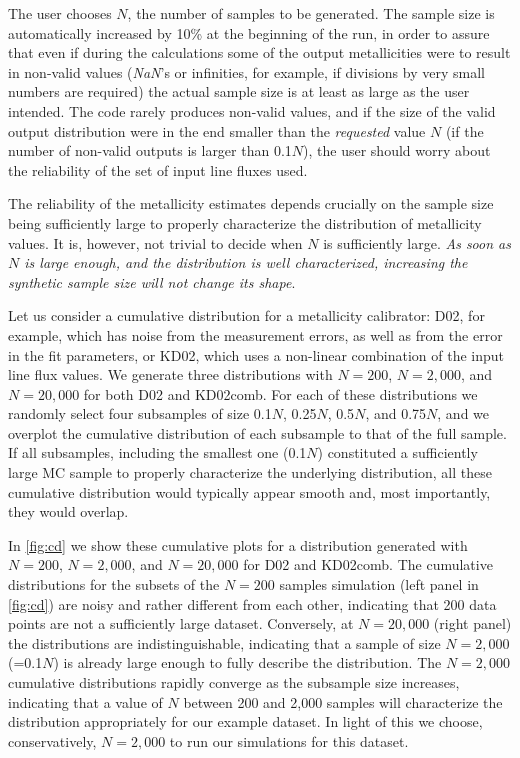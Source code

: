 \documentclass{emulateapj}
\begin{document}
The user chooses $N$, the number of samples to be generated. The
sample size is automatically increased by 10\% at the beginning of the
run, in order to assure that even if during the calculations some of
the output metallicities were to result in non-valid values
(\emph{NaN}'s or infinities, for example, if divisions by very small
numbers are required) the actual sample size is at least as large as
the user intended.  The code rarely produces non-valid values, and if
the size of the valid output distribution were in the end smaller than
the \emph{requested} value $N$ (if the number of non-valid outputs is
larger than 0.1$N$), the user should worry about the reliability of
the set of input line fluxes used.

The reliability of the metallicity estimates depends crucially on the
sample size being sufficiently large to properly characterize the
distribution of metallicity values. It is, however, not trivial to
decide when $N$ is sufficiently large. \emph{As soon as $N$ is large
  enough, and the distribution is well characterized, increasing the
  synthetic sample size will not change its shape}.

Let us consider a cumulative distribution for a metallicity calibrator:
D02, for example, which has noise from the measurement errors, as well
as from the error in the fit parameters, or KD02, which uses a
non-linear combination of the input line flux values. We generate
three distributions with $N=200$, $N=2,000$, and $N=20,000$ for both
D02 and KD02comb.  For each of these distributions we randomly select
four subsamples of size 0.1$N$, 0.25$N$, 0.5$N$, and 0.75$N$, and we
overplot the cumulative distribution of each subsample to that of the
full sample. If all subsamples, including the smallest one (0.1$N$)
constituted a sufficiently large MC sample to properly characterize
the underlying distribution, all these cumulative distribution would
typically appear smooth and, most importantly, they would overlap.

In \autoref{fig:cd} we show these cumulative plots for a distribution
generated with $N=200$, $N=2,000$, and $N=20,000$ for D02 and
KD02comb. The cumulative distributions for the subsets of the $N=200$
samples simulation (left panel in \autoref{fig:cd}) are noisy and
rather different from each other, indicating that 200 data points are
not a sufficiently large dataset. Conversely, at $N=20,000$ (right
panel) the distributions are indistinguishable, indicating that a
sample of size $N=2,000$ (=0.1$N$) is already large enough to fully
describe the distribution. The $N=2,000$ cumulative distributions
rapidly converge as the subsample size increases, indicating that a
value of $N$ between 200 and 2,000 samples will characterize the
distribution appropriately for our example dataset.  In light of this
we choose, conservatively, $N=2,000$ to run our simulations for this
dataset.
\end{document}
